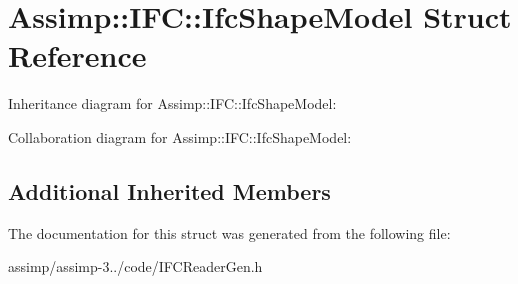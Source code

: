 \hypertarget{struct_assimp_1_1_i_f_c_1_1_ifc_shape_model}{\section{Assimp\+:\+:I\+F\+C\+:\+:Ifc\+Shape\+Model Struct Reference}
\label{struct_assimp_1_1_i_f_c_1_1_ifc_shape_model}
}


Inheritance diagram for Assimp\+:\+:I\+F\+C\+:\+:Ifc\+Shape\+Model\+:


Collaboration diagram for Assimp\+:\+:I\+F\+C\+:\+:Ifc\+Shape\+Model\+:
\subsection*{Additional Inherited Members}


The documentation for this struct was generated from the following file\+:\begin{DoxyCompactItemize}
\item 
assimp/assimp-\/3../code/I\+F\+C\+Reader\+Gen.\+h\end{DoxyCompactItemize}
